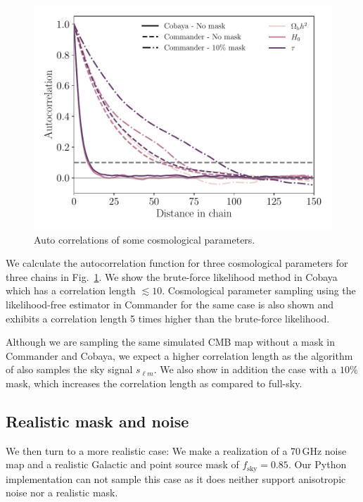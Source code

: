 \documentclass[twocolumn]{../common/aa}
\begin{document}
\begin{figure}
	\centering
	\includegraphics[width=\linewidth]{figures/auto_correlation.pdf}
	\caption{\label{fig:autocorrelation}Auto correlations of some cosmological parameters.}
\end{figure}

We calculate the autocorrelation function for three cosmological parameters for three chains in Fig.~\ref{fig:autocorrelation}. We show the brute-force likelihood method in Cobaya which has a correlation length $\lesssim 10$. Cosmological parameter sampling using the likelihood-free estimator in Commander for the same case is also shown and exhibits a correlation length 5 times higher than the brute-force likelihood.

Although we are sampling the same simulated CMB map without a mask in Commander and Cobaya, we expect a higher correlation length as the algorithm of \citet{raccine2016} also samples the sky signal $s_{\ell m}$. We also show in addition the case with a $10\%$ mask, which increases the correlation length as compared to full-sky.

\subsection{Realistic mask and noise}

We then turn to a more realistic case: We make a realization of a 70\,GHz noise map and a realistic Galactic and point source mask of $f_{\mathrm{sky}}=0.85$. Our Python implementation can not sample this case as it does neither support anisotropic noise nor a realistic mask.
\end{document}
